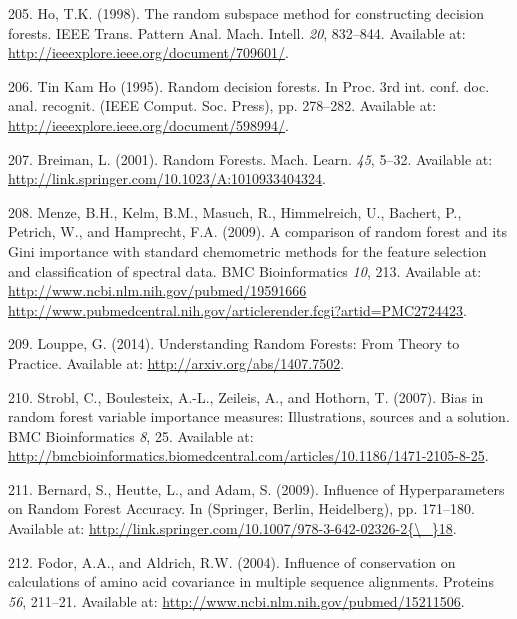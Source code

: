 \documentclass[11pt,a4paper,twoside]{book}
\theoremstyle{definition}
\theoremstyle{definition}
\theoremstyle{remark}
\begin{document}
\hypertarget{ref-Ho1998}{}
205. Ho, T.K. (1998). The random subspace method for constructing
decision forests. IEEE Trans. Pattern Anal. Mach. Intell. \emph{20},
832--844. Available at:
\url{http://ieeexplore.ieee.org/document/709601/}.

\hypertarget{ref-TinKamHo}{}
206. Tin Kam Ho (1995). Random decision forests. In Proc. 3rd int. conf.
doc. anal. recognit. (IEEE Comput. Soc. Press), pp. 278--282. Available
at: \url{http://ieeexplore.ieee.org/document/598994/}.

\hypertarget{ref-Breiman2001}{}
207. Breiman, L. (2001). Random Forests. Mach. Learn. \emph{45}, 5--32.
Available at: \url{http://link.springer.com/10.1023/A:1010933404324}.

\hypertarget{ref-Menze2009}{}
208. Menze, B.H., Kelm, B.M., Masuch, R., Himmelreich, U., Bachert, P.,
Petrich, W., and Hamprecht, F.A. (2009). A comparison of random forest
and its Gini importance with standard chemometric methods for the
feature selection and classification of spectral data. BMC
Bioinformatics \emph{10}, 213. Available at:
\href{http://www.ncbi.nlm.nih.gov/pubmed/19591666\%20http://www.pubmedcentral.nih.gov/articlerender.fcgi?artid=PMC2724423}{http://www.ncbi.nlm.nih.gov/pubmed/19591666 http://www.pubmedcentral.nih.gov/articlerender.fcgi?artid=PMC2724423}.

\hypertarget{ref-Louppe2014}{}
209. Louppe, G. (2014). Understanding Random Forests: From Theory to
Practice. Available at: \url{http://arxiv.org/abs/1407.7502}.

\hypertarget{ref-Strobl2007}{}
210. Strobl, C., Boulesteix, A.-L., Zeileis, A., and Hothorn, T. (2007).
Bias in random forest variable importance measures: Illustrations,
sources and a solution. BMC Bioinformatics \emph{8}, 25. Available at:
\url{http://bmcbioinformatics.biomedcentral.com/articles/10.1186/1471-2105-8-25}.

\hypertarget{ref-Bernard2009}{}
211. Bernard, S., Heutte, L., and Adam, S. (2009). Influence of
Hyperparameters on Random Forest Accuracy. In (Springer, Berlin,
Heidelberg), pp. 171--180. Available at:
\href{http://link.springer.com/10.1007/978-3-642-02326-2\%7B/_\%7D18}{http://link.springer.com/10.1007/978-3-642-02326-2\{\textbackslash{}\_\}18}.

\hypertarget{ref-Fodor2004a}{}
212. Fodor, A.A., and Aldrich, R.W. (2004). Influence of conservation on
calculations of amino acid covariance in multiple sequence alignments.
Proteins \emph{56}, 211--21. Available at:
\url{http://www.ncbi.nlm.nih.gov/pubmed/15211506}.
\end{document}
